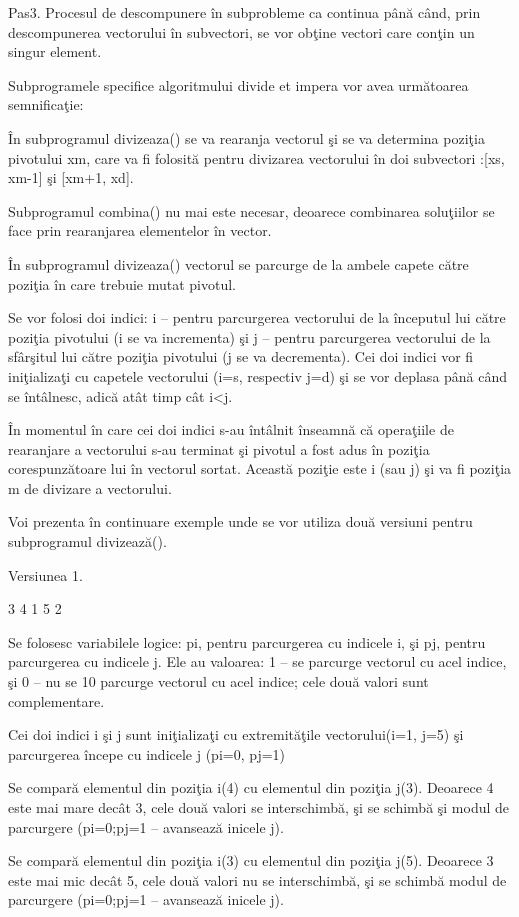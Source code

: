 \documentclass{report}
\begin{document}
Pas3. Procesul de descompunere în subprobleme ca continua până când, prin descompunerea vectorului în subvectori, se vor obţine vectori care conţin un singur element.

Subprogramele specifice algoritmului divide et impera vor avea următoarea semnificaţie:

 În subprogramul divizeaza() se va rearanja vectorul şi se va determina poziţia pivotului xm,
care va fi folosită pentru divizarea vectorului în doi subvectori :[xs, xm-1] şi [xm+1, xd].

 Subprogramul combina() nu mai este necesar, deoarece combinarea soluţiilor se face prin
rearanjarea elementelor în vector.

În subprogramul divizeaza() vectorul se parcurge de la ambele capete către poziţia în care trebuie
mutat pivotul.

Se vor folosi doi indici: i – pentru parcurgerea vectorului de la începutul lui către
poziţia pivotului (i se va incrementa) şi j – pentru parcurgerea vectorului de la sfârşitul lui către
poziţia pivotului (j se va decrementa). Cei doi indici vor fi iniţializaţi cu capetele vectorului (i=s,
respectiv j=d) şi se vor deplasa până când se întâlnesc, adică atât timp cât i<j. 

În momentul în
care cei doi indici s-au întâlnit înseamnă că operaţiile de rearanjare a vectorului s-au terminat şi
pivotul a fost adus în poziţia corespunzătoare lui în vectorul sortat. Această poziţie este i (sau j) şi
va fi poziţia m de divizare a vectorului.


Voi prezenta în continuare exemple unde se vor utiliza două versiuni pentru subprogramul
divizează().

Versiunea 1. 

3 4 1 5 2

Se folosesc variabilele logice: pi, pentru parcurgerea cu indicele i, şi pj, pentru
parcurgerea cu indicele j. Ele au valoarea: 1 – se parcurge vectorul cu acel indice, şi 0 – nu se 
10
parcurge vectorul cu acel indice; cele două valori sunt complementare.

Cei doi indici i şi j sunt iniţializaţi cu extremităţile vectorului(i=1, j=5) şi parcurgerea începe cu
indicele j (pi=0, pj=1)

Se compară elementul din poziţia i(4) cu elementul din poziţia j(3). Deoarece 4 este mai mare
decât 3, cele două valori se interschimbă, şi se schimbă şi modul de parcurgere (pi=0;pj=1 –
avansează inicele j).

Se compară elementul din poziţia i(3) cu elementul din poziţia j(5). Deoarece 3 este mai mic decât 5,
cele două valori nu se interschimbă, şi se schimbă modul de parcurgere (pi=0;pj=1 – avansează inicele
j).
\end{document}
